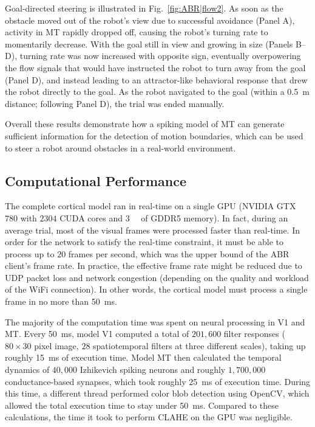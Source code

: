 Goal-directed steering is illustrated in Fig.~\ref{fig:ABR|flow2}. 
As soon as the
obstacle moved out of the robot's view due to successful avoidance
(Panel A), activity in \ac{MT} rapidly dropped off, causing the robot's
turning rate to momentarily decrease. With the goal still in view
and growing in size (Panels B--D), turning rate was now increased
with opposite sign, eventually overpowering the flow signals that
would have instructed the robot to turn away from the goal (Panel
D), and instead leading to an attractor-like behavioral response
that drew the robot directly to the goal. As the robot navigated to
the goal (within a \SI{0.5}{\meter} distance; following Panel D), 
the trial was ended manually.

Overall these results demonstrate how a spiking model of \ac{MT}
can generate sufficient information for the detection of motion
boundaries, which can be used to steer a robot around obstacles
in a real-world environment.


\subsection{Computational Performance}
The complete cortical model ran in real-time on a single \ac{GPU}
(NVIDIA GTX $780$ with $2304$ \ac{CUDA} cores and \SI{3}{\giga\byte}
of GDDR5 memory). In fact, during an average trial, most of the 
visual frames were processed faster than real-time. 
In order for the network to satisfy the real-time constraint, 
it must be able to process up to $20$ frames per second, 
which was the upper bound of the ABR client's frame rate. 
In practice, the effective frame rate might be reduced
due to \ac{UDP} packet loss and network congestion (depending on the
quality and workload of the WiFi connection). In other words, the
cortical model must process a single frame in no more than 
\SI{50}{\milli\second}.

The majority of the computation time was spent on neural processing
in \ac{V1} and \ac{MT}. Every \SI{50}{\milli\second}, model \ac{V1}
computed a total of $201,600$ filter responses 
($80\times30$ pixel image, $28$ spatiotemporal filters at three 
different scales), taking up roughly \SI{15}{\milli\second} of
execution time. Model \ac{MT} then calculated the temporal dynamics
of $40,000$ Izhikevich spiking neurons and roughly $1,700,000$
conductance-based synapses, which took roughly \SI{25}{\milli\second}
of execution time. During this time, a different thread performed 
color blob detection using OpenCV, which allowed the total 
execution time to stay under \SI{50}{\milli\second}. 
Compared to these calculations, the time it took to perform \ac{CLAHE}
on the \ac{GPU} was negligible.




